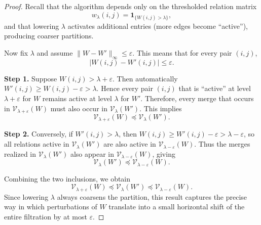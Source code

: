 \documentclass[10pt,a4paper]{amsart}
\begin{document}
\begin{proof}
Recall that the algorithm depends only on the thresholded relation
matrix
\[
w_\lambda(i,j) = \mathbf{1}_{\{W(i,j) > \lambda\}},
\]
and that lowering $\lambda$ activates additional entries (more edges
become ``active''), producing coarser partitions.

Now fix $\lambda$ and assume $\|W - W'\|_\infty \le \varepsilon$.
This means that for every pair $(i,j)$,
\[
|W(i,j) - W'(i,j)| \le \varepsilon.
\]

\textbf{Step 1.}  
Suppose $W(i,j) > \lambda + \varepsilon$.  
Then automatically $W'(i,j) \ge W(i,j) - \varepsilon > \lambda$.  
Hence every pair $(i,j)$ that is ``active'' at level $\lambda + \varepsilon$
for $W$ remains active at level $\lambda$ for $W'$.  
Therefore, every merge that occurs in $\mathcal V_{\lambda+\varepsilon}(W)$
must also occur in $\mathcal V_{\lambda}(W')$.
This implies
\[
\mathcal V_{\lambda+\varepsilon}(W) \preceq \mathcal V_{\lambda}(W').
\]

\textbf{Step 2.}  
Conversely, if $W'(i,j) > \lambda$, then
$W(i,j) \ge W'(i,j) - \varepsilon > \lambda - \varepsilon$,
so all relations active in $\mathcal V_{\lambda}(W')$ are also active in
$\mathcal V_{\lambda - \varepsilon}(W)$.
Thus the merges realized in $\mathcal V_{\lambda}(W')$ also appear in
$\mathcal V_{\lambda - \varepsilon}(W)$, giving
\[
\mathcal V_{\lambda}(W') \preceq \mathcal V_{\lambda - \varepsilon}(W).
\]

Combining the two inclusions, we obtain
\[
\mathcal V_{\lambda+\varepsilon}(W)
  \preceq
\mathcal V_{\lambda}(W')
  \preceq
\mathcal V_{\lambda-\varepsilon}(W).
\]
Since lowering $\lambda$ always coarsens the partition, this result
captures the precise way in which perturbations of $W$ translate into
a small horizontal shift of the entire filtration by at most $\varepsilon$.
\end{proof}
\end{document}
